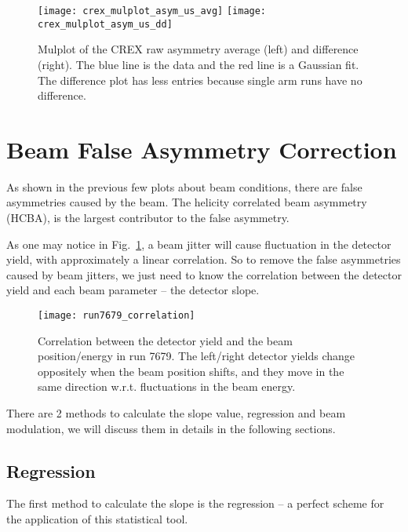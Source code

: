 \begin{figure}[!h]
    \centering
    \texttt{[image: crex\_mulplot\_asym\_us\_avg]}
    \texttt{[image: crex\_mulplot\_asym\_us\_dd]}
    \caption[Mulplots]
    {Mulplot of the CREX raw asymmetry average (left) and difference (right). 
    The blue line is the data and the red line is a Gaussian fit. 
    The difference plot has less entries because single arm runs have no difference.}
\end{figure}


\section{Beam False Asymmetry Correction}
As shown in the previous few plots about beam conditions, there are false
asymmetries caused by the beam. The helicity correlated beam asymmetry (HCBA), 
is the largest contributor to the false asymmetry.

As one may notice in Fig.~\ref{fig:correlation}, a beam jitter will cause 
fluctuation in the detector yield, with approximately a linear correlation.
So to remove the false asymmetries caused by beam jitters, we just need to
know the correlation between the detector yield and each beam parameter -- 
the detector slope. 

\begin{figure}[!h]
    \centering
    \texttt{[image: run7679\_correlation]}
    \caption[Correlation plot in run 7679]
    {Correlation between the detector yield and the beam position/energy in run 7679.
    The left/right detector yields change oppositely when the beam position shifts,
    and they move in the same direction w.r.t. fluctuations in the beam energy.
    }
    \label{fig:correlation}
\end{figure}

There are 2 methods to calculate the slope value, regression and beam modulation,
we will discuss them in details in the following sections.

\subsection{Regression}

The first method to calculate the slope is the regression -- a perfect scheme for
the application of this statistical tool.

